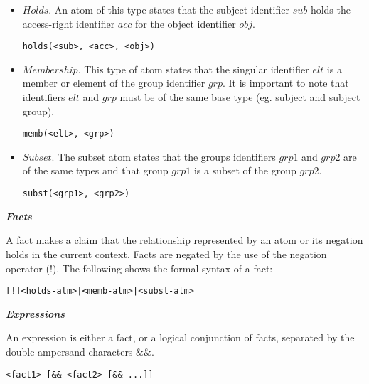 \documentclass[10pt, twocolumn]{article}
\begin{document}
          \begin{itemize}
            \item
              $Holds$. An atom of this type states that the subject identifier
              $sub$ holds the access-right identifier $acc$ for the object
              identifier $obj$.
         
              \begin{verbatim}holds(<sub>, <acc>, <obj>)\end{verbatim}
            \item
              $Membership$. This type of atom states that the singular
              identifier $elt$ is a member or element of the group identifier
              $grp$. It is important to note that identifiers $elt$ and $grp$
              must be of the same base type (eg. subject and subject group).
         
              \begin{verbatim}memb(<elt>, <grp>)\end{verbatim}
            \item
              $Subset$. The subset atom states that the groups identifiers
              $grp1$ and $grp2$ are of the same types and that group $grp1$
              is a subset of the group $grp2$.

              \begin{verbatim}subst(<grp1>, <grp2>)\end{verbatim}
          \end{itemize}

        \noindent \textbf{\emph{Facts}}

          A fact makes a claim that the relationship represented by an atom or
          its negation holds in the current context. Facts are negated by the
          use of the negation operator ($!$). The following shows the formal
          syntax of a fact:
 
          \begin{verbatim}[!]<holds-atm>|<memb-atm>|<subst-atm>\end{verbatim}
 
        \noindent \textbf{\emph{Expressions}}

          An expression is either a fact, or a logical conjunction of facts,
          separated by the double-ampersand characters $\&\&$.

          \begin{verbatim}<fact1> [&& <fact2> [&& ...]]\end{verbatim}
\end{document}
